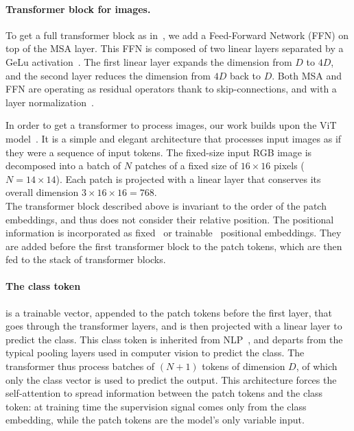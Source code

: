 \paragraph{Transformer block for images.}
To get a full transformer block as in~\cite{Vaswani2017AttentionIA},  we add a Feed-Forward Network (FFN) on top of the MSA layer. This FFN is composed of two linear layers separated by a GeLu activation~\cite{Hendrycks2016GaussianEL}.
The first linear layer expands the dimension from $D$ to $4D$, and the second layer reduces the dimension from $4D$ back to $D$.
Both MSA and FFN are operating as residual operators thank to skip-connections, and with a layer normalization~\cite{ba2016layer}.

In order to get a transformer to process images, our work builds upon the ViT model~\cite{dosovitskiy2020image}.  It is a simple and elegant architecture that processes input images as if they were a sequence of input tokens. The fixed-size input RGB image is decomposed into a batch of $N$ patches of a fixed size of $16\times 16$ pixels ($N=14\times 14$). Each patch is projected with a linear layer that conserves its overall dimension $3 \times 16 \times 16=768$.\\
%
The transformer block described above is invariant to the order of the patch embeddings, and thus does not consider their relative position.
The positional information is incorporated as fixed~\cite{Vaswani2017AttentionIA} or trainable~\cite{ghering2017convseq2seq} positional embeddings. 
They are added before the first transformer block to the patch tokens, which are then fed to the stack of transformer blocks. 




\paragraph{The class token} is a trainable vector, appended to the patch tokens before the first layer, that goes through the transformer layers, and is then projected with a linear layer to predict the class.
This class token is inherited from NLP~\cite{devlin2018bert}, and departs from the typical pooling layers used in computer vision to predict the class. 
The transformer thus process batches of $(N + 1)$ tokens of dimension $D$, of which only the class vector is used to predict the output.
This architecture forces the self-attention to spread information between the patch tokens and the class token: at training time the supervision signal comes only from the class embedding, while the patch tokens are the model's only variable input.


